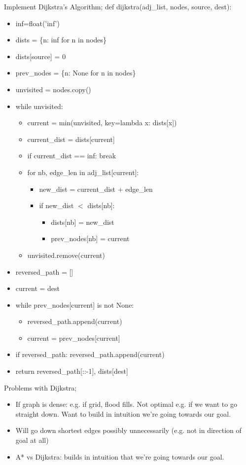 \documentclass{article}
\begin{document}
Implement Dijkstra's Algorithm; def dijkstra(adj\_list, nodes, source, dest):\begin{itemize} \item inf=float('inf') \item dists = \{n: inf for n in nodes\} \item dists[source] = 0 \item prev\_nodes = \{n: None for n in nodes\} \item unvisited = nodes.copy() \item while unvisited: \begin{itemize} \item current = min(unvisited, key=lambda x: dists[x]) \item current\_dist = dists[current] \item if current\_dist == inf: break \item for nb, edge\_len in adj\_list[current]: \begin{itemize} \item new\_dist = current\_dist + edge\_len \item if new\_dist $<$ dists[nb]: \begin{itemize} \item dists[nb] = new\_dist \item prev\_nodes[nb] = current \end{itemize} \end{itemize} \item unvisited.remove(current) \end{itemize} \item reversed\_path = [] \item current = dest \item while prev\_nodes[current] is not None: \begin{itemize} \item reversed\_path.append(current) \item current = prev\_nodes[current] \end{itemize} \item if reversed\_path: reversed\_path.append(current) \item return reversed\_path[::-1], dists[dest] \end{itemize}

Problems with Dijkstra; \begin{itemize} \item If graph is dense: e.g. if grid, flood fills. Not optimal e.g. if we want to go straight down. Want to build in intuition we're going towards our goal.  \item Will go down shortest edges possibly unnecessarily (e.g. not in direction of goal at all) \item A* vs Dijkstra: builds in intuition that we're going towards our goal.  \end{itemize}
\end{document}
